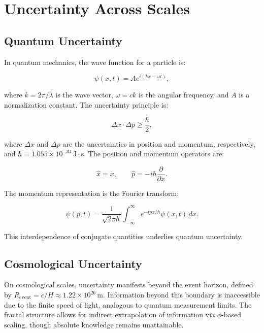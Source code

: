 \documentclass[12pt,a4paper]{article}
\begin{document}
\section{Uncertainty Across Scales}

\subsection{Quantum Uncertainty}

In quantum mechanics, the wave function for a particle is:

\begin{equation}
\psi(x,t) = A e^{i(kx-\omega t)},
\end{equation}

where \(k = 2\pi/\lambda\) is the wave vector, \(\omega = ck\) is the angular frequency, and \(A\) is a normalization constant. The uncertainty principle is:

\begin{equation}
\Delta x \cdot \Delta p \geq \frac{\hbar}{2},
\end{equation}

where \(\Delta x\) and \(\Delta p\) are the uncertainties in position and momentum, respectively, and \(\hbar = 1.055 \times 10^{-34}\,\mathrm{J\cdot s}\). The position and momentum operators are:

\begin{equation}
\hat{x} = x, \qquad \hat{p} = -i\hbar\frac{\partial}{\partial x}.
\end{equation}

The momentum representation is the Fourier transform:

\begin{equation}
\psi(p,t) = \frac{1}{\sqrt{2\pi\hbar}} \int_{-\infty}^{\infty} e^{-ipx/\hbar}\psi(x,t)\,dx.
\end{equation}

This interdependence of conjugate quantities underlies quantum uncertainty.

\subsection{Cosmological Uncertainty}

On cosmological scales, uncertainty manifests beyond the event horizon, defined by \(R_{\mathrm{event}} = c/H \approx 1.22 \times 10^{26}\,\mathrm{m}\). Information beyond this boundary is inaccessible due to the finite speed of light, analogous to quantum measurement limits. The fractal structure allows for indirect extrapolation of information via \(\phi\)-based scaling, though absolute knowledge remains unattainable.
\end{document}
